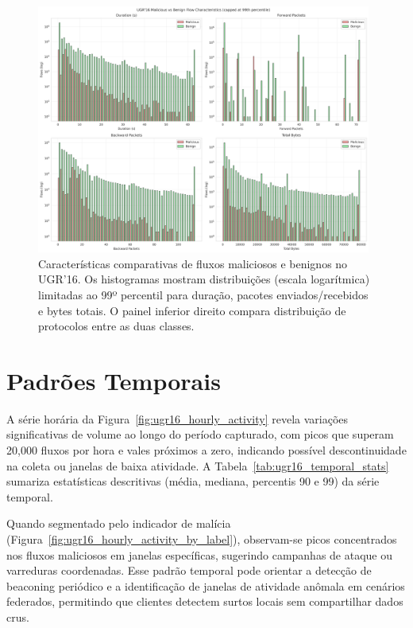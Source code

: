 \documentclass[a4paper, 12pt]{article}
\begin{document}
\begin{figure}[H]
    \centering
    \includegraphics[width=0.98\textwidth]{ugr16_attack_vs_background.png}
    \caption{Características comparativas de fluxos maliciosos e benignos no UGR'16. Os histogramas mostram distribuições (escala logarítmica) limitadas ao 99º percentil para duração, pacotes enviados/recebidos e bytes totais. O painel inferior direito compara distribuição de protocolos entre as duas classes.}
    \label{fig:ugr16_attack_vs_background}
\end{figure}



\section{Padrões Temporais}
A série horária da Figura~\ref{fig:ugr16_hourly_activity} revela variações significativas de volume ao longo do período capturado, com picos que superam 20{,}000 fluxos por hora e vales próximos a zero, indicando possível descontinuidade na coleta ou janelas de baixa atividade. A Tabela~\ref{tab:ugr16_temporal_stats} sumariza estatísticas descritivas (média, mediana, percentis 90 e 99) da série temporal.

Quando segmentado pelo indicador de malícia (Figura~\ref{fig:ugr16_hourly_activity_by_label}), observam-se picos concentrados nos fluxos maliciosos em janelas específicas, sugerindo campanhas de ataque ou varreduras coordenadas. Esse padrão temporal pode orientar a detecção de beaconing periódico e a identificação de janelas de atividade anômala em cenários federados, permitindo que clientes detectem surtos locais sem compartilhar dados crus.
\end{document}
